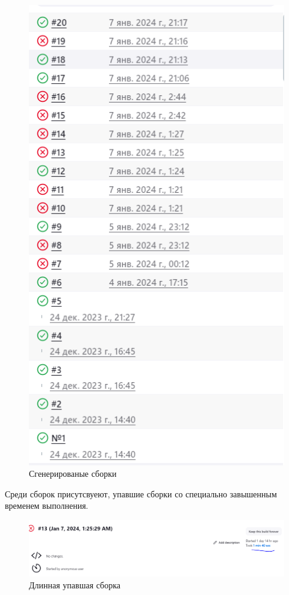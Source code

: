  \begin{figure}[ht!] 
	\center
	\includegraphics [scale=0.47] {my_folder/images//builds}
	\caption{Сгенерированые сборки} 
	\label{fig:builds}  
\end{figure}


 Среди сборок присутсвуеют, упавшие сборки со специально завышенным временем выполнения.
 
 \begin{figure}[ht!] 
	\center
	\includegraphics [scale=0.47] {my_folder/images//longBuild}
	\caption{Длинная упавшая сборка} 
	\label{fig:longBuild}  
\end{figure}


